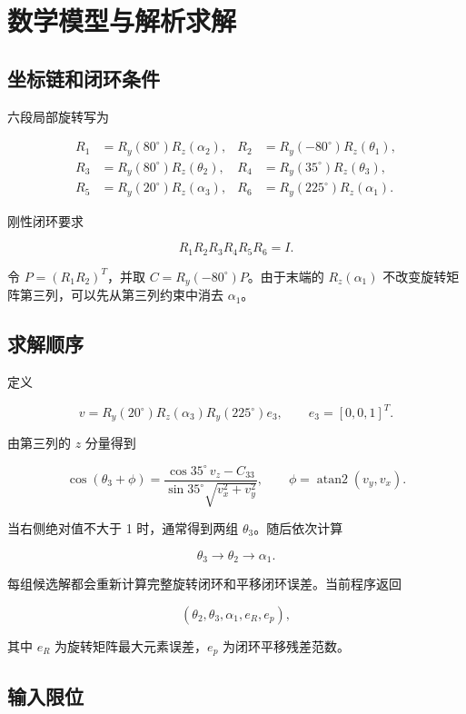 \documentclass[11pt,a4paper,fontset=none]{ctexart}
\begin{document}
\section{数学模型与解析求解}

\subsection{坐标链和闭环条件}

六段局部旋转写为

\[
\begin{aligned}
R_1&=R_y(80^\circ)R_z(\alpha_2), &
R_2&=R_y(-80^\circ)R_z(\theta_1),\\
R_3&=R_y(80^\circ)R_z(\theta_2), &
R_4&=R_y(35^\circ)R_z(\theta_3),\\
R_5&=R_y(20^\circ)R_z(\alpha_3), &
R_6&=R_y(225^\circ)R_z(\alpha_1).
\end{aligned}
\]

刚性闭环要求

\[
R_1R_2R_3R_4R_5R_6=I.
\]

令 $P=(R_1R_2)^T$，并取 $C=R_y(-80^\circ)P$。由于末端的 $R_z(\alpha_1)$ 不改变旋转矩阵第三列，可以先从第三列约束中消去 $\alpha_1$。

\subsection{求解顺序}

定义

\[
v=R_y(20^\circ)R_z(\alpha_3)R_y(225^\circ)e_3,
\qquad e_3=[0,0,1]^T.
\]

由第三列的 $z$ 分量得到

\[
\cos(\theta_3+\phi)=
\frac{\cos35^\circ\,v_z-C_{33}}
{\sin35^\circ\sqrt{v_x^2+v_y^2}},
\qquad
\phi=\operatorname{atan2}(v_y,v_x).
\]

当右侧绝对值不大于 1 时，通常得到两组 $\theta_3$。随后依次计算

\[
\theta_3\longrightarrow\theta_2\longrightarrow\alpha_1.
\]

每组候选解都会重新计算完整旋转闭环和平移闭环误差。当前程序返回

\[
(\theta_2,\theta_3,\alpha_1,e_R,e_p),
\]

其中 $e_R$ 为旋转矩阵最大元素误差，$e_p$ 为闭环平移残差范数。

\subsection{输入限位}
\end{document}
